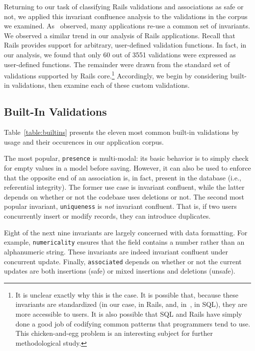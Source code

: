 Returning to our task of classifying Rails validations and
associations as safe or not, we applied this invariant confluence analysis to the
validations in the corpus we examined. As~\cite{coord-avoid} observed,
many applications re-use a common set of invariants. We observed a
similar trend in our analysis of Rails applications. Recall that Rails
provides support for arbitrary, user-defined validation functions. In
fact, in our analysis, we found that only 60 out of 3551 validations
were expressed as user-defined functions. The remainder were drawn
from the standard set of validations supported by Rails
core.\footnote{It is unclear exactly why this is the case. It is
  possible that, because these invariants are standardized (in our
  case, in Rails, and, in~\cite{coord-avoid}, in SQL), they are more
  accessible to users. It is also possible that SQL and Rails have
  simply done a good job of codifying common patterns that programmers
  tend to use. This chicken-and-egg problem is an interesting subject
  for further methodological study.} Accordingly, we begin by
considering built-in validations, then examine each of these custom
validations.

\subsection{Built-In Validations}

Table~\ref{table:builtins} presents the eleven most common built-in
validations by usage and their occurences in our application
corpus.

The most popular, \texttt{presence} is multi-modal: its basic
behavior is to simply check for empty values in a model before
saving. However, it can also be used to enforce that the opposite end
of an association is, in fact, present in the database (i.e.,
referential integrity). The former use case is invariant confluent,
while the latter depends on whether or not the codebase uses deletions
or not. The second most popular invariant, \texttt{uniqueness} is
\textit{not} invariant confluent. That is, if two users concurrently
insert or modify records, they can introduce duplicates.

Eight of the next nine invariants are largely concerned with data
formatting. For example, \texttt{numericality} ensures that the field
contains a number rather than an alphanumeric string. These invariants
are indeed invariant confluent under concurrent update. Finally,
\texttt{associated} depends on whether or not the current updates are
both insertions (safe) or mixed insertions and deletions
(unsafe).

